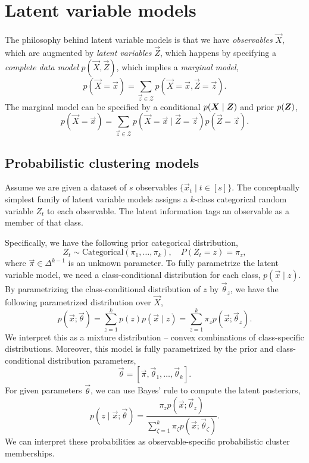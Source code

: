 \section{Latent variable models}

The philosophy behind latent variable models is that we have \textit{observables} $\vec{X}$, which
are augmented by \textit{latent variables} $\vec{Z}$, which happens by specifying a
\textit{complete data model} $p(\vec{X}, \vec{Z})$, which implies a \textit{marginal model}, \[
    p(\vec{X} = \vec{x}) = \sum_{\vec{z} \in \mathcal{Z}} p(\vec{X} = \vec{x}, \vec{Z} = \vec{z}).
\]
The marginal model can be specified by a conditional $p(\bm{X} \mid \bm{Z})$ and prior
$p(\bm{Z})$, \[
    p(\vec{X} = \vec{x}) = \sum_{\vec{z} \in \mathcal{Z}} p(\vec{X} = \vec{x} \mid \vec{Z} = \vec{z}) p(\vec{Z} = \vec{z}).
\]

\subsection{Probabilistic clustering models}

Assume we are given a dataset of $s$ observables $\{ \vec{x}_t \mid t \in [s] \}$. The conceptually
simplest family of latent variable models assigns a $k$-class categorical random variable $Z_t$ to
each observable. The latent information tags an observable as a member of that class.

Specifically, we have the following prior categorical distribution, \[
    Z_t \sim \mathrm{Categorical}(\pi_1, \ldots, \pi_k), \quad P(Z_t = z) = \pi_z,
\]
where $\vec{\pi} \in \Delta^{k-1}$ is an unknown parameter. To fully parametrize the latent variable model, we need a
class-conditional distribution for each class, $p(\vec{x} \mid z)$. By parametrizing the
class-conditional distribution of $z$ by $\vec{\theta}_z$, we have the following parametrized
distribution over $\vec{X}$, \[
    p(\vec{x}; \vec{\theta}) = \sum_{z=1}^{k} p(z) p(\vec{x} \mid z) = \sum_{z=1}^{k} \pi_z p(\vec{x}; \vec{\theta}_z).
\]
We interpret this as a mixture distribution -- convex combinations of class-specific distributions.
Moreover, this model is fully parametrized by the prior and class-conditional distribution
parameters, \[
    \vec{\theta} = [\vec{\pi}, \vec{\theta}_1, \ldots, \vec{\theta}_k].
\]
For given parameters $\vec{\theta}$, we can use Bayes' rule to compute the latent posteriors, \[
    p(z \mid \vec{x}; \vec{\theta}) = \frac{\pi_z p(\vec{x}; \vec{\theta}_z)}{\sum_{\zeta=1}^{k} \pi_{\zeta} p(\vec{x}; \vec{\theta}_{\zeta})}.
\]
We can interpret these probabilities as observable-specific probabilistic cluster memberships.

